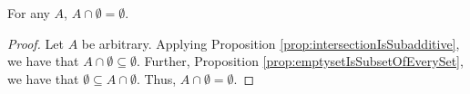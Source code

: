 \guard








\begin{prop}
\label{prop:intersectionWithEmptysetIsEmpty}
  For any $A$, $A\cap\emptyset=\emptyset$.
\end{prop}
\begin{proof}
  Let $A$ be arbitrary.
  Applying Proposition \ref{prop:intersectionIsSubadditive}, we have that $A\cap\emptyset\subseteq \emptyset$.
  Further, Proposition \ref{prop:emptysetIsSubsetOfEverySet}, we have that $\emptyset\subseteq A\cap\emptyset$.
  Thus, $A\cap\emptyset=\emptyset$.
\end{proof}
